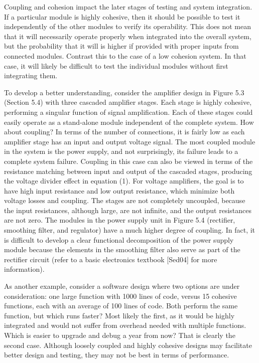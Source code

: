 Coupling and cohesion impact the later stages of testing and system
integration. If a particular module is highly cohesive, then it should
be possible to test it independently of the other modules to verify its
operability. This does not mean that it will necessarily operate
properly when integrated into the overall system, but the probability
that it will is higher if provided with proper inputs from connected
modules. Contrast this to the case of a low cohesion system. In that
case, it will likely be difficult to test the individual modules without
first integrating them.

To develop a better understanding, consider the amplifier design in
Figure 5.3 (Section 5.4) with three cascaded amplifier stages. Each
stage is highly cohesive, performing a singular function of signal
amplification. Each of these stages could easily operate as a
stand-alone module independent of the complete system. How about
coupling? In terms of the number of connections, it is fairly low as
each amplifier stage has an input and output voltage signal. The most
coupled module in the system is the power supply, and not surprisingly,
its failure leads to a complete system failure. Coupling in this case
can also be viewed in terms of the resistance matching between input and
output of the cascaded stages, producing the voltage divider effect in
equation (1). For voltage amplifiers, the goal is to have high input
resistance and low output resistance, which minimize both voltage losses
and coupling. The stages are not completely uncoupled, because the input
resistances, although large, are not infinite, and the output
resistances are not zero. The modules in the power supply unit in Figure
5.4 (rectifier, smoothing filter, and regulator) have a much higher
degree of coupling. In fact, it is difficult to develop a clear
functional decomposition of the power supply module because the elements
in the smoothing filter also serve as part of the rectifier circuit
(refer to a basic electronics textbook {[}Sed04{]} for more
information).

As another example, consider a software design where two options are
under consideration: one large function with 1000 lines of code, versus
15 cohesive functions, each with an average of 100 lines of code. Both
perform the same function, but which runs faster? Most likely the first,
as it would be highly integrated and would not suffer from overhead
needed with multiple functions. Which is easier to upgrade and debug a
year from now? That is clearly the second case. Although loosely coupled
and highly cohesive designs may facilitate better design and testing,
they may not be best in terms of performance.

